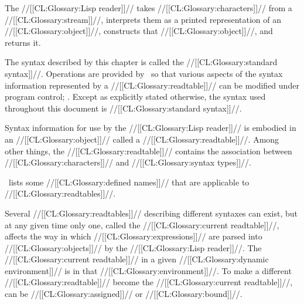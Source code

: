 






The //[[CL:Glossary:Lisp reader]]// takes //[[CL:Glossary:characters]]// from a //[[CL:Glossary:stream]]//, 
interprets them as a printed representation of an //[[CL:Glossary:object]]//,
constructs that //[[CL:Glossary:object]]//, and returns it.

The syntax described by this chapter is called the //[[CL:Glossary:standard syntax]]//.
Operations are provided by \clisp\ so that
various aspects of the syntax information represented by a //[[CL:Glossary:readtable]]// 
can be modified under program control; \seechapter\Reader.
Except as explicitly stated otherwise, 
the syntax used throughout this document is //[[CL:Glossary:standard syntax]]//.


Syntax information for use by the //[[CL:Glossary:Lisp reader]]// is embodied in an
//[[CL:Glossary:object]]// called a //[[CL:Glossary:readtable]]//.  Among other things, 
the //[[CL:Glossary:readtable]]// contains the association between //[[CL:Glossary:characters]]// 
and //[[CL:Glossary:syntax types]]//.

\Thenextfigure\ lists some //[[CL:Glossary:defined names]]// that are applicable to
//[[CL:Glossary:readtables]]//.




Several //[[CL:Glossary:readtables]]// describing different syntaxes can exist,
but at any given time only one, called the //[[CL:Glossary:current readtable]]//, 
affects the way in which //[[CL:Glossary:expressions]]// are parsed 
into //[[CL:Glossary:objects]]// by the //[[CL:Glossary:Lisp reader]]//.
The //[[CL:Glossary:current readtable]]// in a given //[[CL:Glossary:dynamic environment]]//
is  in that //[[CL:Glossary:environment]]//.
To make a different //[[CL:Glossary:readtable]]// become the //[[CL:Glossary:current readtable]]//,
 can be //[[CL:Glossary:assigned]]// or //[[CL:Glossary:bound]]//.

